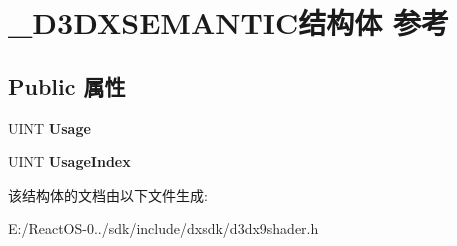 \hypertarget{struct___d3_d_x_s_e_m_a_n_t_i_c}{}\section{\+\_\+\+D3\+D\+X\+S\+E\+M\+A\+N\+T\+I\+C结构体 参考}
\label{struct___d3_d_x_s_e_m_a_n_t_i_c}
\subsection*{Public 属性}
\begin{DoxyCompactItemize}
\item 
\mbox{\label{struct___d3_d_x_s_e_m_a_n_t_i_c_a949a5d4a921b78c9ee3624565613e36a}} 
U\+I\+NT {\bfseries Usage}
\item 
\mbox{\label{struct___d3_d_x_s_e_m_a_n_t_i_c_afb7de86e45fc9cc204277a8a28232ab9}} 
U\+I\+NT {\bfseries Usage\+Index}
\end{DoxyCompactItemize}


该结构体的文档由以下文件生成\+:\begin{DoxyCompactItemize}
\item 
E\+:/\+React\+O\+S-\/0../sdk/include/dxsdk/d3dx9shader.\+h\end{DoxyCompactItemize}
